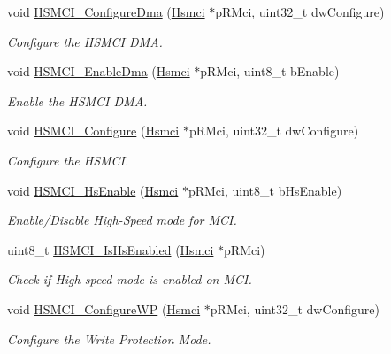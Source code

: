\begin{DoxyCompactItemize}
void \mbox{\hyperlink{group__hsmci__functions_gaceb167f796372edad0ce22b545dfbf54}{H\+S\+M\+C\+I\+\_\+\+Configure\+Dma}} (\mbox{\hyperlink{structHsmci}{Hsmci}} $\ast$p\+R\+Mci, uint32\+\_\+t dw\+Configure)
\begin{DoxyCompactList}\small\item\em Configure the H\+S\+M\+CI D\+MA. \end{DoxyCompactList}\item 
void \mbox{\hyperlink{group__hsmci__functions_gaf2f9c4d2b276027b3c238530ed107308}{H\+S\+M\+C\+I\+\_\+\+Enable\+Dma}} (\mbox{\hyperlink{structHsmci}{Hsmci}} $\ast$p\+R\+Mci, uint8\+\_\+t b\+Enable)
\begin{DoxyCompactList}\small\item\em Enable the H\+S\+M\+CI D\+MA. \end{DoxyCompactList}\item 
void \mbox{\hyperlink{group__hsmci__functions_gae212bc49645bc7b10e0f46159737f874}{H\+S\+M\+C\+I\+\_\+\+Configure}} (\mbox{\hyperlink{structHsmci}{Hsmci}} $\ast$p\+R\+Mci, uint32\+\_\+t dw\+Configure)
\begin{DoxyCompactList}\small\item\em Configure the H\+S\+M\+CI. \end{DoxyCompactList}\item 
void \mbox{\hyperlink{group__hsmci__functions_ga9365f2817b47644f8c0f325a915fb141}{H\+S\+M\+C\+I\+\_\+\+Hs\+Enable}} (\mbox{\hyperlink{structHsmci}{Hsmci}} $\ast$p\+R\+Mci, uint8\+\_\+t b\+Hs\+Enable)
\begin{DoxyCompactList}\small\item\em Enable/\+Disable High-\/\+Speed mode for M\+CI. \end{DoxyCompactList}\item 
uint8\+\_\+t \mbox{\hyperlink{group__hsmci__functions_gad4ba27f7339c9558b66aef5d9ebf6cab}{H\+S\+M\+C\+I\+\_\+\+Is\+Hs\+Enabled}} (\mbox{\hyperlink{structHsmci}{Hsmci}} $\ast$p\+R\+Mci)
\begin{DoxyCompactList}\small\item\em Check if High-\/speed mode is enabled on M\+CI. \end{DoxyCompactList}\item 
void \mbox{\hyperlink{group__hsmci__functions_ga4b461ac473c06a1c56e475f5f0810c06}{H\+S\+M\+C\+I\+\_\+\+Configure\+WP}} (\mbox{\hyperlink{structHsmci}{Hsmci}} $\ast$p\+R\+Mci, uint32\+\_\+t dw\+Configure)
\begin{DoxyCompactList}\small\item\em Configure the Write Protection Mode. \end{DoxyCompactList}\item 

\end{DoxyCompactItemize}
